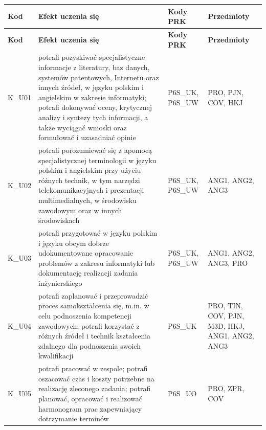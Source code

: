 \documentclass[12pt,a4paper]{article}
\newcommand{\thdrule}{\noalign{\global\setlength{\extrarowheight}{0pt}}}
\newcommand{\thdend}{\noalign{\global\setlength{\extrarowheight}{4pt}}}
\begin{document}
{\scriptsize
\begin{longtable}{m{1cm}m{8.8cm}m{2.1cm}m{2.5cm}}
\thdrule\toprule
\rowcolor{pjatkRed} {\color{white}\footnotesize\textbf{\vphantom{Ag}Kod}} & {\color{white}\footnotesize\textbf{\vphantom{Ag}Efekt uczenia się}} & {\color{white}\footnotesize\textbf{\vphantom{Ag}Kody PRK}} & {\color{white}\footnotesize\textbf{\vphantom{Ag}Przedmioty}} \\
\midrule\thdend
\endfirsthead
\thdrule\toprule
\rowcolor{pjatkRed} {\color{white}\footnotesize\textbf{\vphantom{Ag}Kod}} & {\color{white}\footnotesize\textbf{\vphantom{Ag}Efekt uczenia się}} & {\color{white}\footnotesize\textbf{\vphantom{Ag}Kody PRK}} & {\color{white}\footnotesize\textbf{\vphantom{Ag}Przedmioty}} \\
\midrule\thdend
\endhead
\rowcolor{tableRowLight} K\_U01 & potrafi pozyskiwać specjalistyczne informacje z literatury, baz danych, systemów patentowych, Internetu oraz innych źródeł, w języku polskim i angielskim w zakresie informatyki; potrafi dokonywać oceny, krytycznej analizy i syntezy tych informacji, a także wyciągać wnioski oraz formułować i uzasadniać opinie & {\scriptsize P6S\_UK, P6S\_UW} & {\scriptsize PRO, PJN, COV, HKJ} \\
\rowcolor{tableRowAlt} K\_U02 & potrafi porozumiewać się z apomocą specjalistycznej terminologii w języku polskim i angielskim przy użyciu różnych technik, w tym narzędzi telekomunikacyjnych i prezentacji multimedialnych, w środowisku zawodowym oraz w innych środowiskach & {\scriptsize P6S\_UK, P6S\_UW} & {\scriptsize ANG1, ANG2, ANG3} \\
\rowcolor{tableRowLight} K\_U03 & potrafi przygotować w języku polskim i języku obcym dobrze udokumentowane opracowanie problemów z zakresu informatyki lub dokumentację realizacji zadania inżynierskiego & {\scriptsize P6S\_UK, P6S\_UW} & {\scriptsize ANG1, ANG2, ANG3, PRO} \\
\rowcolor{tableRowAlt} K\_U04 & potrafi zaplanować i przeprowadzić proces samokształcenia się, m.in. w celu podnoszenia kompetencji zawodowych; potrafi korzystać z różnych źródeł i technik kształcenia zdalnego dla podnoszenia swoich kwalifikacji & {\scriptsize P6S\_UK} & {\scriptsize PRO, TIN, COV, PJN, M3D, HKJ, ANG1, ANG2, ANG3} \\
\rowcolor{tableRowLight} K\_U05 & potrafi pracować w zespole; potrafi oszacować czas i koszty potrzebne na realizację zleconego zadania; potrafi planować, opracować i realizować harmonogram prac zapewniający dotrzymanie terminów & {\scriptsize P6S\_UO} & {\scriptsize PRO, ZPR, COV} \\

\end{longtable}}
\end{document}
